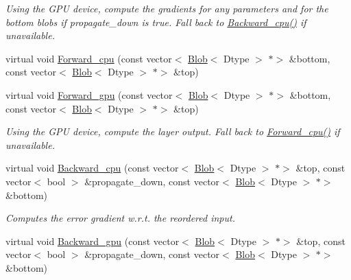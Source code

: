 \begin{DoxyCompactItemize}
\begin{DoxyCompactList}\small\item\em Using the G\+PU device, compute the gradients for any parameters and for the bottom blobs if propagate\+\_\+down is true. Fall back to \mbox{\hyperlink{classcaffe_1_1_batch_reindex_layer_a8306bf8f4c49c33fc2a7cecbb436e5dc}{Backward\+\_\+cpu()}} if unavailable. \end{DoxyCompactList}\item 
virtual void \mbox{\hyperlink{classcaffe_1_1_batch_reindex_layer_aba17361a36c34e4b08609d22902e7501}{Forward\+\_\+cpu}} (const vector$<$ \mbox{\hyperlink{classcaffe_1_1_blob}{Blob}}$<$ Dtype $>$ $\ast$$>$ \&bottom, const vector$<$ \mbox{\hyperlink{classcaffe_1_1_blob}{Blob}}$<$ Dtype $>$ $\ast$$>$ \&top)
\item 
\mbox{\label{classcaffe_1_1_batch_reindex_layer_aa1535f3f9332348dee1a491465f495ed}} 
virtual void \mbox{\hyperlink{classcaffe_1_1_batch_reindex_layer_aa1535f3f9332348dee1a491465f495ed}{Forward\+\_\+gpu}} (const vector$<$ \mbox{\hyperlink{classcaffe_1_1_blob}{Blob}}$<$ Dtype $>$ $\ast$$>$ \&bottom, const vector$<$ \mbox{\hyperlink{classcaffe_1_1_blob}{Blob}}$<$ Dtype $>$ $\ast$$>$ \&top)
\begin{DoxyCompactList}\small\item\em Using the G\+PU device, compute the layer output. Fall back to \mbox{\hyperlink{classcaffe_1_1_batch_reindex_layer_af7de3792af32dc8025c359700bd40b5e}{Forward\+\_\+cpu()}} if unavailable. \end{DoxyCompactList}\item 
virtual void \mbox{\hyperlink{classcaffe_1_1_batch_reindex_layer_ad1d2d65deb3fe0400f76fc19ebe4498e}{Backward\+\_\+cpu}} (const vector$<$ \mbox{\hyperlink{classcaffe_1_1_blob}{Blob}}$<$ Dtype $>$ $\ast$$>$ \&top, const vector$<$ bool $>$ \&propagate\+\_\+down, const vector$<$ \mbox{\hyperlink{classcaffe_1_1_blob}{Blob}}$<$ Dtype $>$ $\ast$$>$ \&bottom)
\begin{DoxyCompactList}\small\item\em Computes the error gradient w.\+r.\+t. the reordered input. \end{DoxyCompactList}\item 
\mbox{\label{classcaffe_1_1_batch_reindex_layer_a2d561aef5ce7e09115af143c553e7af5}} 
virtual void \mbox{\hyperlink{classcaffe_1_1_batch_reindex_layer_a2d561aef5ce7e09115af143c553e7af5}{Backward\+\_\+gpu}} (const vector$<$ \mbox{\hyperlink{classcaffe_1_1_blob}{Blob}}$<$ Dtype $>$ $\ast$$>$ \&top, const vector$<$ bool $>$ \&propagate\+\_\+down, const vector$<$ \mbox{\hyperlink{classcaffe_1_1_blob}{Blob}}$<$ Dtype $>$ $\ast$$>$ \&bottom)

\end{DoxyCompactItemize}
